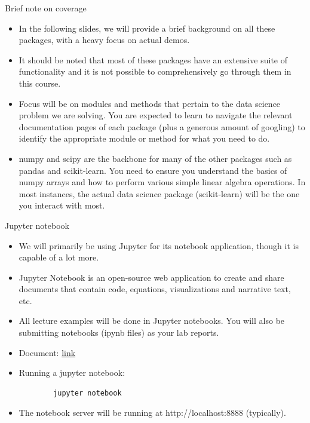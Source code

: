 \documentclass[aspectratio=169]{beamer}
\begin{document}
\begin{frame}{Brief note on coverage}
    \begin{itemize}
        \item In the following slides, we will provide a brief background on all these packages, with a heavy focus on actual demos.
        \item It should be noted that most of these packages have an extensive suite of functionality and it is not possible to comprehensively go through them in this course. 
        \item Focus will be on modules and methods that pertain to the data science problem we are solving. You are expected to learn to navigate the relevant documentation pages of each package (plus a generous amount of googling) to identify the appropriate module or method for what you need to do.
        \item numpy and scipy are the backbone for many of the other packages such as pandas and scikit-learn. You need to ensure you understand the basics of numpy arrays and how to perform various simple linear algebra operations. In most instances, the actual data science package (scikit-learn) will be the one you interact with most.
    \end{itemize}
\end{frame} 


\begin{frame}[fragile]{Jupyter notebook}
    \begin{itemize}
        \item We will primarily be using Jupyter for its notebook application, though it is capable of a lot more.
        \item Jupyter Notebook is an open-source web application to create and share documents that contain code, equations, visualizations and narrative text, etc.
        \item All lecture examples will be done in Jupyter notebooks. You will also be submitting notebooks (ipynb files) as your lab reports.
        \item Document: \href{http://jupyter-notebook.readthedocs.io/en/stable/}{link}
        \item Running a jupyter notebook:
        \begin{lstlisting}
        jupyter notebook
        \end{lstlisting}
        \item The notebook server will be running at http://localhost:8888 (typically).
    \end{itemize}
\end{frame}
\end{document}
